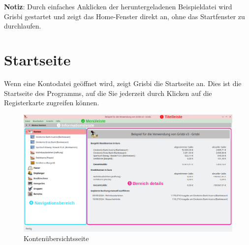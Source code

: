 
\textbf{Notiz}: Durch einfaches Anklicken der heruntergeladenen Beispieldatei wird Grisbi gestartet und zeigt das Home-Fenster direkt an, ohne das Startfenster zu durchlaufen.%



\section{Startseite\label{home}}%


Wenn eine Kontodatei geöffnet wird, zeigt Grisbi die Startseite an.%
Dies ist die Startseite des Programms, auf die Sie jederzeit durch Klicken auf die Registerkarte  zugreifen können.%


\begin{figure}[htbp]			%
	\begin{center}
		\includegraphics[width=1\textwidth]{image/screenshot/home_3.0.png}
	\end{center}
	\caption{Kontenübersichtsseite}		%
	\label{home_3.0}
\end{figure}

